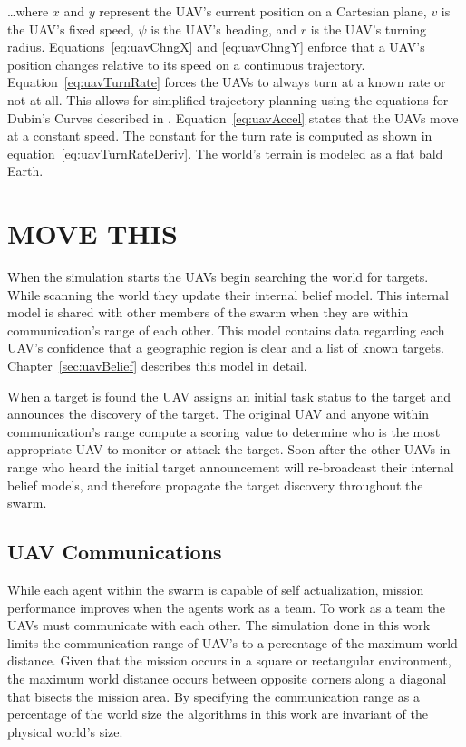 \dots where $x$ and $y$ represent the UAV's current position on a Cartesian plane, $v$ is the UAV's fixed speed, $\psi$ is the UAV's heading, and $r$ is the UAV's turning radius.  Equations~\ref{eq:uavChngX} and \ref{eq:uavChngY} enforce that a UAV's position changes relative to its speed on a continuous trajectory.  Equation~\ref{eq:uavTurnRate} forces the UAVs to always turn at a known rate or not at all.  This allows for simplified trajectory planning using the equations for Dubin's Curves described in \cite{dubins}.  Equation~\ref{eq:uavAccel} states that the UAVs move at a constant speed.  The constant for the turn rate is computed as shown in equation~\ref{eq:uavTurnRateDeriv}.  The world's terrain is modeled as a flat bald Earth.










\chapter{MOVE THIS}

When the simulation starts the UAVs begin searching the world for targets.  While scanning the world they update their internal belief model.  This internal model is shared with other members of the swarm when they are within communication's range of each other.  This model contains data regarding each UAV's confidence that a geographic region is clear and a list of known targets.  Chapter~\ref{sec:uavBelief} describes this model in detail.

When a target is found the UAV assigns an initial task status to the target and announces the discovery of the target.  The original UAV and anyone within communication's range compute a scoring value to determine who is the most appropriate UAV to monitor or attack the target.  Soon after the other UAVs in range who heard the initial target announcement will re-broadcast their internal belief models, and therefore propagate the target discovery throughout the swarm.

\section{UAV Communications}
While each agent within the swarm is capable of self actualization, mission performance improves when the agents work as a team.  To work as a team the UAVs must communicate with each other.  The simulation done in this work limits the communication range of UAV's to a percentage of the maximum world distance.  Given that the mission occurs in a square or rectangular environment, the maximum world distance occurs between opposite corners along a diagonal that bisects the mission area.  By specifying the communication range as a percentage of the world size the algorithms in this work are invariant of the physical world's size.

